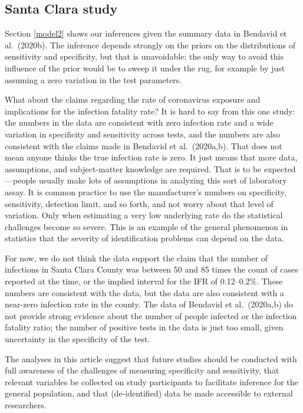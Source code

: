 \documentclass[11pt]{article}
\begin{document}
\subsection{Santa Clara study}

Section \ref{model2} shows our inferences given the summary data in
Bendavid et al.\ (2020b).  The inference depends strongly on the
priors on the distributions of sensitivity and specificity, but that
is unavoidable: the only way to avoid this influence of the prior
would be to sweep it under the rug, for example by just assuming a
zero variation in the test parameters.

What about the claims regarding the rate of coronavirus exposure and
implications for the infection fatality rate?  It is hard to say from
this one study: the numbers in the data are consistent with zero
infection rate and a wide variation in specificity and sensitivity
across tests, and the numbers are also consistent with the claims made
in Bendavid et al.\ (2020a,b). That does not mean anyone thinks the
true infection rate is zero.  It just means that more data,
assumptions, and subject-matter knowledge are required. That is to be
expected---people usually make lots of assumptions in analyzing this
sort of laboratory assay. It is common practice to use the
manufacturer's numbers on specificity, sensitivity, detection limit,
and so forth, and not worry about that level of variation. Only when
estimating a very low underlying rate do the statistical challenges
become so severe. This is an example of the general phenomenon in
statistics that the severity of identification problems can depend on
the data.

For now, we do not think the data support the claim that the number of
infections in Santa Clara County was between 50 and 85 times the count
of cases reported at the time, or the implied interval for the IFR of
0.12--0.2\%.  These numbers are consistent with the data, but the data
are also consistent with a near-zero infection rate in the county.
The data of Bendavid et al.\ (2020a,b) do not provide strong evidence
about the number of people infected or the infection fatality ratio;
the number of positive tests in the data is just too small, given
uncertainty in the specificity of the test.

The analyses in this article suggest that future studies should be
conducted with full awareness of the challenges of measuring
specificity and sensitivity, that relevant variables be collected on
study participants to facilitate inference for the general population,
and that (de-identified) data be made accessible to external
researchers.
\end{document}
